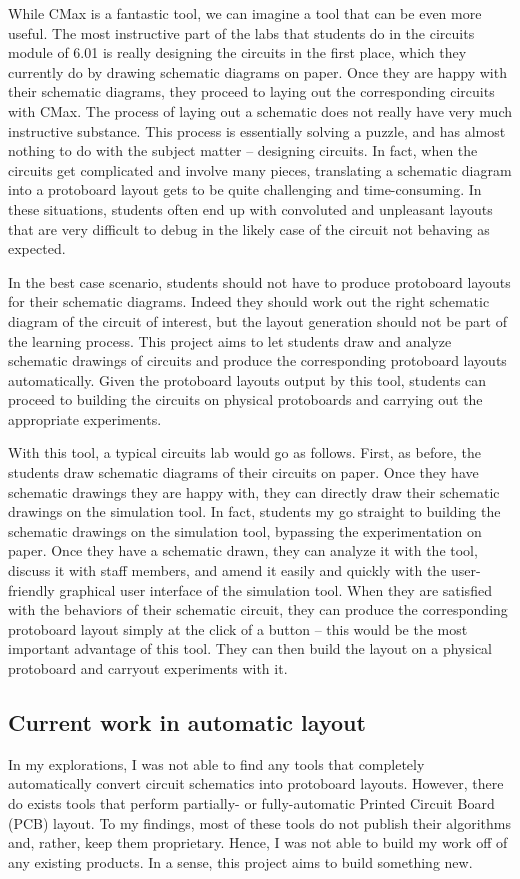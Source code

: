 While CMax is a fantastic tool, we can imagine a tool that can be even more
useful. The most instructive part of the labs that students do in the circuits
module of 6.01 is really designing the circuits in the first place, which they
currently do by drawing schematic diagrams on paper. Once they are happy with
their schematic diagrams, they proceed to laying out the corresponding circuits
with CMax. The process of laying out a schematic does not really have very much
instructive substance. This process is essentially solving a puzzle, and has
almost nothing to do with the subject matter -- designing circuits. In fact,
when the circuits get complicated and involve many pieces, translating a
schematic diagram into a protoboard layout gets to be quite challenging and
time-consuming. In these situations, students often end up with convoluted and
unpleasant layouts that are very difficult to debug in the likely case of the
circuit not behaving as expected.

In the best case scenario, students should not have to produce protoboard
layouts for their schematic diagrams. Indeed they should work out the right
schematic diagram of the circuit of interest, but the layout generation should
not be part of the learning process. This project aims to let students draw and
analyze schematic drawings of circuits and produce the corresponding protoboard
layouts automatically. Given the protoboard layouts output by this tool,
students can proceed to building the circuits on physical protoboards and
carrying out the appropriate experiments.

With this tool, a typical circuits lab would go as follows. First, as before,
the students draw schematic diagrams of their circuits on paper. Once they have
schematic drawings they are happy with, they can directly draw their schematic
drawings on the simulation tool. In fact, students my go straight to building
the schematic drawings on the simulation tool, bypassing the experimentation on
paper. Once they have a schematic drawn, they can analyze it with the tool,
discuss it with staff members, and amend it easily and quickly with the
user-friendly graphical user interface of the simulation tool. When they are
satisfied with the behaviors of their schematic circuit, they can produce the
corresponding protoboard layout simply at the click of a button -- this would be
the most important advantage of this tool. They can then build the layout on a
physical protoboard and carryout experiments with it.

\subsection{Current work in automatic layout}

In my explorations, I was not able to find any tools that completely
automatically convert circuit schematics into protoboard layouts. However, there
do exists tools that perform partially- or fully-automatic Printed Circuit
Board (PCB) layout. To my findings, most of these tools do not publish their
algorithms and, rather, keep them proprietary. Hence, I was not able to build my
work off of any existing products. In a sense, this project aims to build
something new.
